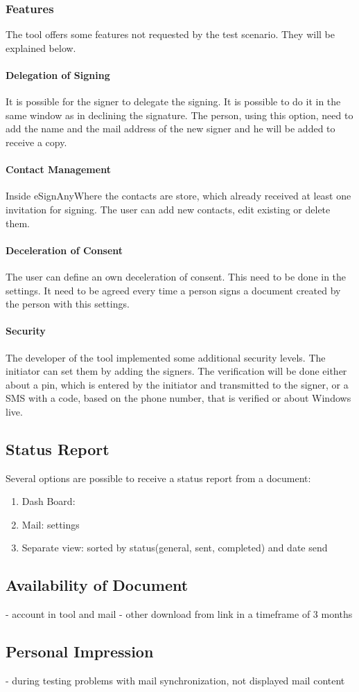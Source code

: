 \subsubsection{Features}
The tool offers some features not requested by the test scenario. They will be explained below.

\paragraph{Delegation of Signing}
It is possible for the signer to delegate the signing. It is possible to do it in the same window as in declining the signature. The person, using this option, need to add the name and the mail address of the new signer and he will be added to receive a copy.

\paragraph{Contact Management}
Inside eSignAnyWhere the contacts are store, which already received at least one invitation for signing. The user can add new contacts, edit existing or delete them.

\paragraph{Deceleration of Consent}
The user can define an own deceleration of consent. This need to be done in the settings. It need to be agreed every time a person signs a document created by the person with this settings.

\paragraph{Security}
The developer of the tool implemented some additional security levels. The initiator can set them by adding the signers. The verification will be done either about a pin, which is entered by the initiator and transmitted to the signer, or a SMS with a code, based on the phone number, that is verified or about Windows live.

\subsection{Status Report}
Several options are possible to receive a status report from a document:
\begin{enumerate}
	\item Dash Board:
	\item Mail: settings
	\item Separate view: sorted by status(general, sent, completed) and date send
\end{enumerate}

\subsection{Availability of Document}
- account in tool and mail
- other download from link in a timeframe of 3 months

\subsection{Personal Impression}
- during testing problems with mail synchronization, not displayed mail content